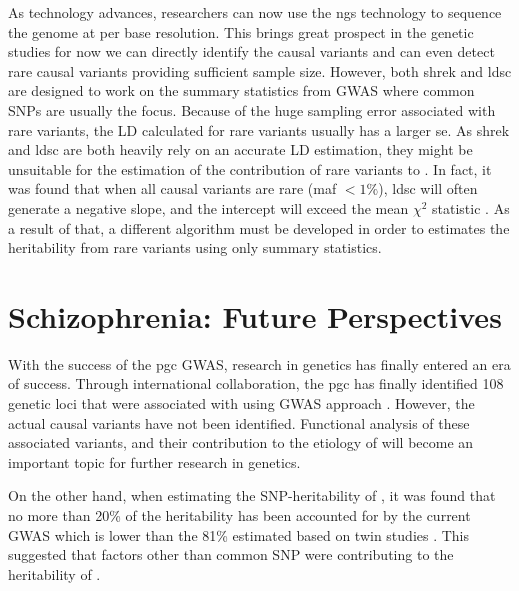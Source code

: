 \documentclass[12pt]{scrbook}
\newcommand*{\glng}{\glsentrylong}
\begin{document}
	As technology advances, researchers can now use the \gls{ngs} technology to sequence the genome at per base resolution. 
	This brings great prospect in the genetic studies for now we can directly identify the causal variants and can even detect rare causal variants providing sufficient sample size. 
	However, both \gls{shrek} and \gls{ldsc} are designed to work on the summary statistics from \gls{GWAS} where common \glspl{SNP} are usually the focus. 
	Because of the huge sampling error associated with rare variants, the \gls{LD} calculated for rare variants usually has a larger \gls{se}.
	As \gls{shrek} and \gls{ldsc} are both heavily rely on an accurate \gls{LD} estimation, they might be unsuitable for the estimation of the contribution of rare variants to \glng{scz}. 
	In fact, it was found that when all causal variants are rare (\gls{maf} $<1\%$), \gls{ldsc} will often generate a negative slope, and the intercept will exceed the mean $\chi^2$ statistic \citep{Bulik-Sullivan2015}.
	As a result of that, a different algorithm must be developed in order to estimates the heritability from rare variants using only summary statistics.
	
	\section{Schizophrenia: Future Perspectives}
	With the success of the \gls{pgc} \glng{scz} \gls{GWAS}, research in \glng{scz} genetics has finally entered an era of success.
	Through international collaboration, the \gls{pgc} has finally identified 108 genetic loci that were associated with \glng{scz} using \gls{GWAS} approach \citep{Ripke2014}.
	However, the actual causal variants have not been identified. 
	Functional analysis of these associated variants, and their contribution to the etiology of \glng{scz} will become an important topic for further research in \glng{scz} genetics.
	
	On the other hand, when estimating the \gls{SNP}-heritability of \glng{scz}, it was found that no more than 20\% of the heritability has been accounted for by the current \gls{GWAS} which is lower than the 81\% estimated based on twin studies \citep{Sullivan2003}. 
	This suggested that factors other than common \gls{SNP} were contributing to the heritability of \glng{scz}.
	
\end{document}
